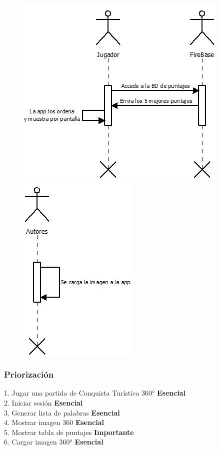 \begin{figure}[H]
   \includegraphics[scale=0.6]{imgs/DS_5.jpeg}
   \includegraphics[scale=0.6]{imgs/DS_6.jpeg}
\end{figure}

\subsubsection{Priorización}
1. Jugar una partida de Conquista Turística 360° \textbf{Esencial}\\
2. Iniciar sesión \textbf{Esencial}\\
3. Generar lista de palabras \textbf{Esencial}\\
4. Mostrar imagen 360 \textbf{Esencial}\\
5. Mostrar tabla de puntajes \textbf{Importante}\\
6. Cargar imagen 360° \textbf{Esencial}\\

